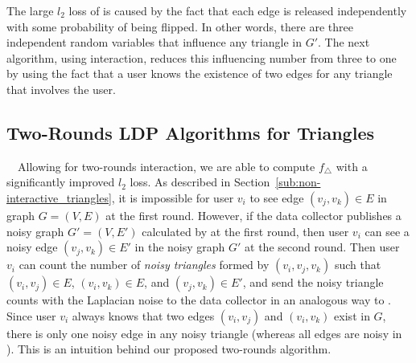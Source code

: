 
The large $l_2$ loss of  is caused by the fact that 
each edge is released independently with
some probability of being flipped. 
In other words, 
there are three independent random
variables that influence 
any triangle in $G'$. 
The next algorithm,
using interaction, 
reduces 
this influencing number 
from three to one 
by using the fact that 
a user 
knows 
the existence of two edges for any triangle that involves the user. 

\subsection{Two-Rounds LDP Algorithms for Triangles}
\label{sub:two_rounds}

~~Allowing for 
two-rounds interaction, 
we are able to compute $f_{\triangle}$ with
a significantly improved $l_2$ loss. 
As described in Section~\ref{sub:non-interactive_triangles}, it is impossible for user $v_i$ to see edge $(v_j, v_k) \in E$ in graph $G=(V,E)$ at the first round. 
However, if 
the data collector publishes a noisy graph $G'=(V,E')$ calculated by  at the first round, then 
user $v_i$ can see a noisy edge $(v_j, v_k) \in E'$ in the noisy graph $G'$ at the second round. 
Then user $v_i$ can count the number of \textit{noisy triangles} formed by $(v_i, v_j, v_k)$ such that $(v_i,v_j) \in E$, $(v_i,v_k) \in E$, and $(v_j,v_k) \in E'$, and send the noisy triangle counts with the Laplacian noise to the data collector in an analogous way to . 
Since user $v_i$ always knows that two edges $(v_i,v_j)$ and $(v_i,v_k)$ exist in $G$, 
there is only one noisy edge in any noisy triangle 
(whereas all edges are noisy in ).
This is an intuition behind our proposed two-rounds algorithm. 

